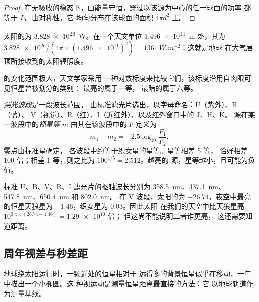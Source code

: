 \begin{proof}
在无吸收的稳态下，由能量守恒，穿过以该源为中心的任一球面的功率
都等于 $L$。由对称性，它
均匀分布在该球面的面积 $4\pi d^2$ 上。
\end{proof}

\begin{example}
太阳的为 \qty{3.828e26}{W}。在一个天文单位
\qty{1.496e11}{m} 处，其为 $\num{3.828e26}/(4\pi\times
(\num{1.496e11})^2) = \qty{1361}{W.m^{-2}}$：这就是地球
在大气层顶所接收到的太阳辐照度。
\end{example}

的变化范围极大，天文学家采用
一种对数标度来比较它们，该标度沿用自肉眼可见恒星曾被划分的类别：
最亮的属于一等，
最暗的属于六等。

\begin{definition}\label{def:b1:observing-the-sky:magnitude}
\emph{测光波段}是一段波长范围，
由标准滤光片选出，以字母命名：U（紫外）、B（蓝）、
V（视觉）、R（红）、I（近红外），以及红外窗口中的 J、H、K。
源在某一波段中的\emph{视星等} $m$
由其在该波段中的 $F$ 定义为
\[
  m_1 - m_2 = -2.5\log_{10}\frac{F_1}{F_2} ,
\]
零点由标准星确定，
各波段中约等于织女星的星等。星等相差 5 等，
恰好相差 100 倍；相差 1 等，则之比为 $100^{1/5} = 2.512$。越亮的
源，星等越小，且可能为负值。
\end{definition}

标准 U、B、V、R、I 滤光片的枢轴波长分别为
\qty{358.5}{nm}、\qty{437.1}{nm}、\qty{547.8}{nm}、\qty{650.4}{nm} 和
\qty{802.0}{nm}。
在 V 波段，太阳的为 $-26.74$，夜空中最亮的恒星天狼星为
$-1.46$，织女星为 $0.03$。因此太阳
在我们的天空中比天狼星亮 $10^{0.4\times(26.74 - 1.46)} = \num{1.29e10}$ 倍；
但这尚不能说明二者谁更亮，
这还需要知道距离。

\subsection*{周年视差与秒差距}

地球绕太阳运行时，一颗近处的恒星相对于
远得多的背景恒星似乎在移动，一年中描出一个小椭圆。这
种视运动是测量恒星距离最直接的方法：它
以地球轨道作为测量基线。

